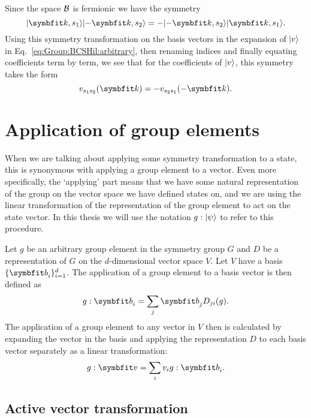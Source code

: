 Since the space $\mathcal{B}$ is fermionic we have the symmetry 
\begin{equation}
    \label{eq:Group:BCSHil:fermSymm}
    \ket{\v{k},s_1}\ket{-\v{k},s_2} = -\ket{-\v{k},s_2}\ket{\v{k},s_1}.
\end{equation}
Using this symmetry transformation on the basis vectors in the expansion of $\lvert v \rangle$ in Eq.~\eqref{eq:Group:BCSHil:arbitrary}, then renaming indices
and finally equating coefficients term by term, we see that for the coefficients of $\lvert v \rangle$, this symmetry takes the form
\begin{equation}
    \label{eq:GroupBCSHil:fermSymmCoeff}
    v_{s_1s_2}(\v{k}) = -v_{s_2s_1}(-\v{k}).
\end{equation}


\section{Application of group elements}

When we are talking about applying some symmetry transformation to a state, this is synonymous with applying a group element to a vector.
Even more specifically, the `applying' part means that we have some natural representation of the group on the vector space we have defined
states on, and we are using the linear transformation of the representation of the group element to act on the state vector. In this
thesis we will use the notation $g:\lvert \psi \rangle$ to refer to this procedure.

Let $g$ be an arbitrary group element in the symmetry group $G$ and $D$ be a representation of $G$ on the $d$-dimensional vector space $V$.
Let $V$ have a basis $\{\v{b}_i\}_{i=1}^d$. The application of a group element to a basis vector is then defined as
\begin{equation}
    \label{eq:Group:Prod:basisApp}
    g:\v{b}_i = \sum_j\v{b}_jD_{ji}(g).
\end{equation}
The application of a group element to any vector in $V$ then is calculated by expanding the vector in the basis and applying the representation
$D$ to each basis vector separately as a linear transformation:
\begin{equation}
    \label{eq:Group:App:linearTransformApp}
    g:\v{v} = \sum_iv_ig:\v{b}_i.
\end{equation}

\subsection{Active vector transformation}

